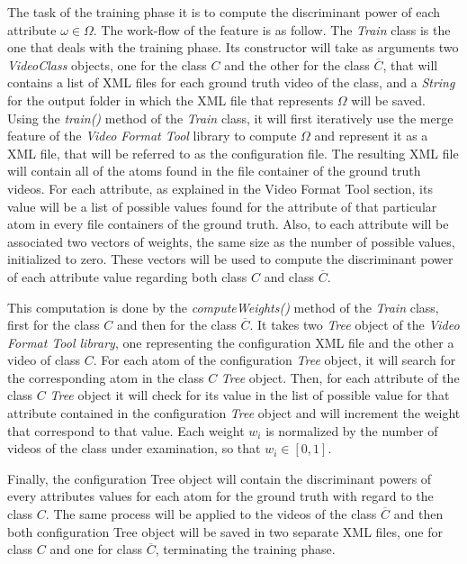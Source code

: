 The task of the training phase it is to compute the discriminant power of each attribute $\omega \in \Omega$. The work-flow of the feature is as follow. The \emph{Train} class is the one that deals with the training phase. Its constructor will take as arguments two \emph{VideoClass} objects, one for the class $C$ and the other for the class $\overline{C}$, that will contains a list of XML files for each ground truth video of the class, and a \emph{String} for the output folder in which the XML file that represents $\Omega$ will be saved.
Using the \emph{train()} method of the \emph{Train} class, it will first iteratively use the merge feature of the \emph{Video Format Tool} library to compute $\Omega$ and represent it as a XML file, that will be referred to as the configuration file. The resulting XML file will contain all of the atoms found in the file container of the ground truth videos. For each attribute, as explained in the Video Format Tool section, its value will be a list of possible values found for the attribute of that particular atom in every file containers of the ground truth. Also, to each attribute will be associated two vectors of weights, the same size as the number of possible values, initialized to zero. These vectors will be used to compute the discriminant power of each attribute value regarding both class $C$ and class $\overline{C}$.

This computation is done by the \emph{computeWeights()} method of the \emph{Train} class, first for the class $C$ and then for the class $\overline{C}$. It takes two \emph{Tree} object of the \emph{Video Format Tool library}, one representing the configuration XML file and the other a video of class $C$. For each atom of the configuration \emph{Tree} object, it will search for the corresponding atom in the class $C$ \emph{Tree} object. Then, for each attribute of the class $C$ \emph{Tree} object it will check for its value in the list of possible value for that attribute contained in the configuration \emph{Tree} object and will increment the weight that correspond to that value. Each weight $w_{i}$ is normalized by the number of videos of the class under examination, so that $w_{i} \in \left[0, 1\right] $.

Finally, the configuration Tree object will contain the discriminant powers of every attributes values for each atom for the ground truth with regard to the class $C$. The same process will be applied to the videos of the class $\overline{C}$ and then both configuration Tree object will be saved in two separate XML files, one for class $C$ and one for class $\overline{C}$, terminating the training phase.


